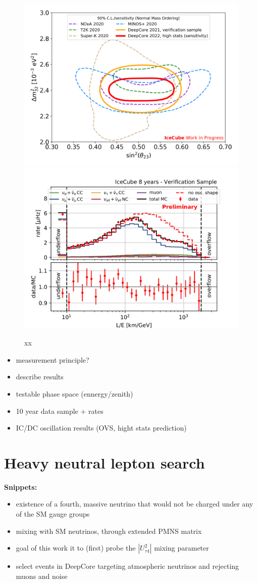 \documentclass[a4paper,11pt]{article}
\begin{document}
\begin{figure}[h]
  \includegraphics[width=0.49\linewidth]{figures/OscNext_numu_disappearance_sensitivity_public_v2.png}
  \includegraphics[width=.49\linewidth]{figures/OVS_l_over_e.png}
  \caption{xx}
  \label{fig:oscnext_oscillations_results}
\end{figure}



\begin{itemize}
    \item measurement principle?
    \item describe results
    \item testable phase space (ennergy/zenith)
    \item 10 year data sample + rates
    \item IC/DC oscillation results (OVS, hight stats prediction)
\end{itemize}


\section{Heavy neutral lepton search}

\textbf{Snippets:}
\begin{itemize}
    \item existence of a fourth, massive neutrino that would not be charged under any of the SM gauge groups
    \item mixing with SM neutrinos, through extended PMNS matrix
    \item goal of this work it to (first) probe the $|U_{\tau4}^2|$ mixing parameter
    \item select events in DeepCore targeting atmospheric neutrinos and rejecting muons and noise
\end{itemize}
\end{document}

